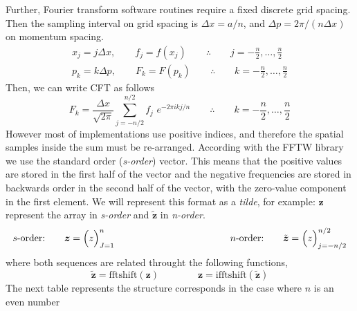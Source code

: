 Further, Fourier transform software routines require a fixed discrete grid spacing.
Then the sampling interval on grid spacing is $\Delta x=a/n$, and $\Delta p =2\pi/(n\Delta x)$ on momentum spacing.
\begin{equation}
\begin{gathered}
x_j = j\Delta x, \qquad f_j = f(x_j) \qquad\therefore\qquad j=-\frac{n}{2},\ldots,\frac{n}{2}
\\[4mm]
p_k = k\Delta p, \qquad F_k = F(p_k) \qquad\therefore\qquad k=-\frac{n}{2},\ldots,\frac{n}{2}
\end{gathered}
\end{equation}
Then, we can write CFT as follows
\begin{equation}
F_k = \frac{\Delta x}{\sqrt{2\pi}}\sum_{j=-n/2}^{n/2} f_j\,\, e^{-2\pi i kj/n}
\qquad\therefore\qquad
k=-\frac{n}{2},\ldots,\frac{n}{2}
\label{eq: CFT raw}
\end{equation}
However most of implementations use positive indices, and therefore the spatial samples inside the sum must be re-arranged.
According with the FFTW library we use the standard order (\textit{s-order}) vector. This means that the
positive values are stored in the first half of the vector and the negative frequencies
are stored in backwards order in the second half of the vector, with the zero-value component
in the first element. We will represent this format as a \textit{tilde}, for example: $\mathbf{z}$
represent the array in \textit{s-order} and $\mathbf{\tilde{z}}$ in \textit{n-order}.
\begin{equation}
\text{$s$-order:}\qquad \boldsymbol{z} = \Bigl( z \Bigr)_{J=1}^n
\qquad\qquad\qquad\qquad\qquad\qquad
\text{$n$-order:}\qquad \tilde{\boldsymbol{z}} = \Bigl( z \Bigr)_{j=-n/2}^{n/2}
\end{equation}
where both sequences are related throught the following functions,
\begin{equation}
\tilde{\boldsymbol{z}} = \text{fftshift}(\boldsymbol{z}) \qquad\qquad \boldsymbol{z} = \text{ifftshift}(\tilde{\boldsymbol{z}})
\end{equation}
The next table represents the structure corresponds in the case where $n$ is an even number
\vspace{5mm}
